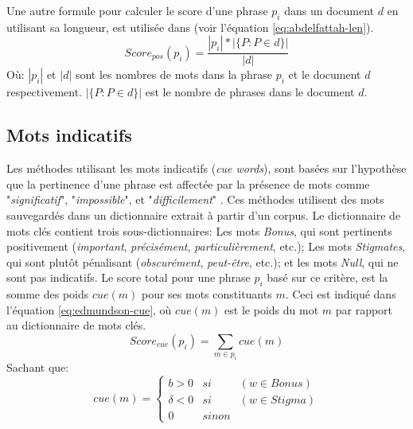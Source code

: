 \documentclass[a4paper,12pt,oneside]{../use/ESIthesis}
\begin{document}
Une autre formule pour calculer le score d'une phrase $ p_i $ dans un document $ d $ en utilisant sa longueur, est utilisée dans \cite{09-abdelfattah-ren} (voir l'équation \ref{eq:abdelfattah-len}). 
\begin{equation}
\label{eq:abdelfattah-len}
Score_{pos}(p_i) = \frac{|p_i| * |\{P: P \in d\}|}{|d|}
\end{equation}
Où: 
$ |p_i| $ et $ |d| $ sont les nombres de mots dans la phrase $ p_i $ et le document $ d $ respectivement. 
$ |\{P: P \in d\}| $ est le nombre de phrases dans le document $ d $. 

\subsection{Mots indicatifs} %

Les méthodes utilisant les mots indicatifs (\textit{cue words}), sont basées sur l'hypothèse que la pertinence d'une phrase est affectée par la présence de mots comme "\textit{significatif}", "\textit{impossible}", et "\textit{difficilement}" \cite{69-edmundson}. 
Ces méthodes utilisent des mots sauvegardés dans un dictionnaire extrait à partir d'un corpus. 
Le dictionnaire de mots clés contient trois sous-dictionnaires: Les mots \textit{Bonus}, qui sont pertinents positivement (\textit{important}, \textit{précisément}, \textit{particulièrement}, etc.); Les mots \textit{Stigmates}, qui sont plutôt pénalisant (\textit{obscurément}, \textit{peut-être}, etc.); et les mots \textit{Null}, qui ne sont pas indicatifs. 
Le score total pour une phrase $ p_i $ basé sur ce critère, est la somme des poids $ cue(m) $ pour ses mots constituants $ m $. 
Ceci est indiqué dans l'équation \ref{eq:edmundson-cue}, où $ cue(m) $ est le poids du mot $ m $ par rapport au dictionnaire de mots clés. 
\begin{equation}
\label{eq:edmundson-cue}
Score_{cue}(p_i) = \sum_{m \in p_i}{cue(m)}
\end{equation}
Sachant que:
\begin{equation}
\label{eq:edmundson-cue2}
cue(m) = \left\lbrace 
\begin{array}{lll}
b > 0 & si & (w \in Bonus) \\
\delta < 0 & si & (w \in Stigma) \\
0 & sinon & 
\end{array} 
\right. 
\end{equation}
\end{document}
